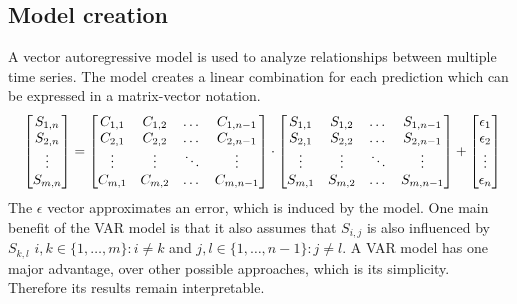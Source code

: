 \documentclass{article}
\theoremstyle{plain}
\theoremstyle{definition}
\theoremstyle{remark}
\begin{document}
\subsection{Model creation}\label{sec:methods:var}
A vector autoregressive model is used to analyze relationships between multiple time series.
The model creates a linear combination for each prediction which can be expressed in a matrix-vector notation.
\begin{equation*}
    \resizebox{\linewidth}{!}{
        $\begin{bmatrix}
            S_{1,n}\\
            S_{2,n}\\
            \vdots \\
            S_{m,n}
        \end{bmatrix} = 
        \begin{bmatrix}
            C_{1,1} & C_{1,2} & \dots &C_{1,n-1}\\
            C_{2,1} & C_{2,2} &\dots & C_{2,n-1}\\
            \vdots & \vdots  & \ddots &\vdots\\
            C_{m,1} & C_{m,2} &\dots &C_{m,n-1}\\
        \end{bmatrix} \cdot
        \begin{bmatrix}
            S_{1,1} & S_{1,2} & \dots & S_{1,n-1}\\
            S_{2,1} & S_{2,2} & \dots & S_{2,n-1}\\
            \vdots & \vdots  & \ddots &\vdots\\
            S_{m,1} & S_{m,2} & \dots & S_{m,n-1}\\
        \end{bmatrix}+
        \begin{bmatrix}
            \epsilon_{1}\\
            \epsilon_{2}\\
            \vdots\\
            \epsilon_{n}\\
        \end{bmatrix}$%
    }
\end{equation*}
The $\epsilon$ vector approximates an error, which is induced by the model. One main benefit of the VAR model is that it also assumes
that $S_{i,j}$ is also influenced by $S_{k,l}$ $i,k \in \{1,\dots, m\}: i\neq k$ and $j,l \in \{1,\dots, n-1\}: j\neq l$.
A VAR model has one major advantage, over other possible approaches, which is its simplicity. Therefore its results remain interpretable.
\end{document}
